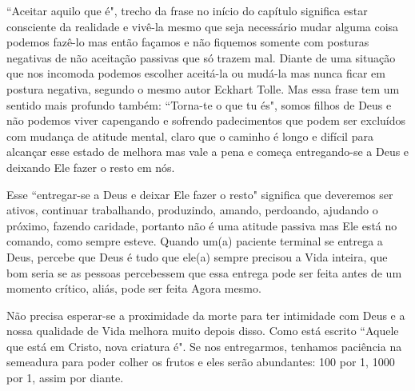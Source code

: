 \emdash{}``Aceitar aquilo que é", trecho da frase no início do capítulo significa estar consciente da realidade e vivê-la mesmo que seja necessário mudar alguma coisa podemos fazê-lo mas então façamos e não fiquemos somente com posturas negativas de não aceitação passivas que só trazem mal. Diante de uma situação que nos incomoda podemos escolher aceitá-la ou mudá-la mas nunca ficar em postura negativa, segundo o mesmo autor Eckhart Tolle. Mas essa frase tem um sentido mais profundo também: ``Torna-te o que tu és", somos filhos de Deus e não podemos viver capengando e sofrendo padecimentos que podem ser excluídos com mudança de atitude mental, claro que o caminho é longo e difícil para alcançar esse estado de melhora mas vale a pena e começa entregando-se a Deus e deixando Ele fazer o resto em nós.

\emdash{}Esse ``entregar-se a Deus e deixar Ele fazer o resto" significa que deveremos ser ativos, continuar trabalhando, produzindo, amando, perdoando, ajudando o próximo, fazendo caridade, portanto não é uma atitude passiva mas Ele está no comando, como sempre esteve. Quando um(a) paciente terminal se entrega a Deus, percebe que Deus é tudo que ele(a) sempre precisou a Vida inteira, que bom seria se as pessoas percebessem que essa entrega pode ser feita antes de um momento crítico, aliás, pode ser feita Agora mesmo.

\emdash{}Não precisa esperar-se a proximidade da morte para ter intimidade com Deus e a nossa qualidade de Vida melhora muito depois disso.  Como está escrito ``Aquele que está em Cristo, nova criatura é". Se nos entregarmos, tenhamos paciência na semeadura para poder colher os frutos e eles serão abundantes: 100 por 1, 1000 por 1, assim por diante.